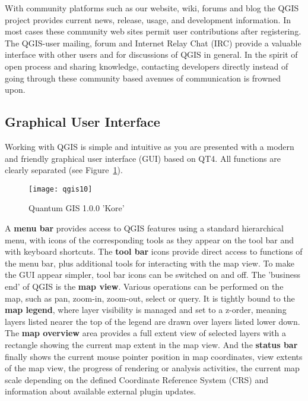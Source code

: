 With community platforms such as our website, wiki, forums and blog the QGIS
project
provides current news, release, usage, and development information. In most
cases 
these community web sites permit user contributions after registering. 
The QGIS-user mailing, forum and Internet Relay Chat (IRC) provide a valuable
interface 
with other users and for discussions of QGIS in general. In the spirit of open 
process and sharing knowledge, contacting developers directly instead of going
through 
these community based avenues of communication is frowned upon.

\subsection{Graphical User Interface}

Working with QGIS is simple and intuitive as you are presented with a
modern and friendly graphical user interface (GUI) based on QT4. All
functions are clearly separated (see Figure~\ref{fig:qgis10}).

\begin{figure}[h]
   \begin{center}
   \caption{Quantum GIS 1.0.0 'Kore'}\label{fig:qgis10}\smallskip
   \texttt{[image: qgis10]}
\end{center}
\end{figure}

A \textbf{menu bar} provides access to QGIS features using a standard
hierarchical menu, with icons of the corresponding tools as they appear on
the tool bar and with keyboard shortcuts. The \textbf{tool bar} icons provide
direct access to functions of the menu bar, plus additional tools for
interacting with the map view. To make the GUI appear simpler, tool bar icons
can be switched on and off. The 'business end' of QGIS is the \textbf{map
view}. Various operations can be performed on the map, such as pan, zoom-in,
zoom-out, select or query. It is tightly bound to the \textbf{map legend},
where layer visibility is managed and set to a z-order, meaning layers
listed nearer the top of the legend are drawn over layers listed lower down.
The \textbf{map overview} area provides a full extent view of selected layers
with a rectangle showing the current map extent in the map view. And the
\textbf{status bar} finally shows the current mouse pointer position in map
coordinates, view extents of the map view, the progress of rendering or
analysis activities, the current map scale depending on the defined
Coordinate Reference System (CRS) and information about available external
plugin updates.

